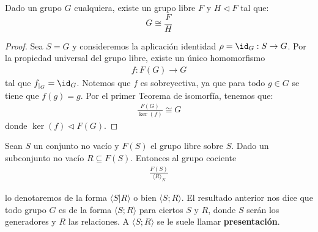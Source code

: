 \begin{coro}
    Dado un grupo $G$ cualquiera, existe un grupo libre $F$ y $H \lhd F$ tal que:
    \begin{equation*}
        G \cong \frac{F}{H}
    \end{equation*}
    \begin{proof}
        Sea $S=G$ y consideremos la aplicación identidad $\rho = \id_G : S \to G$. Por la propiedad universal del grupo libre, existe un único homomorfismo
        \begin{gather*}
            f:F(G) \to G
        \end{gather*}
        tal que $f_{|_G}=\id_G$. Notemos que $f$ es sobreyectiva, ya que para todo $g\in G$ se tiene que $f(g)=g$. Por el primer Teorema de isomorfía, tenemos que:
        \begin{gather*}
            \frac{F(G)}{\ker(f)} \cong G
        \end{gather*}
        donde $\ker(f)\lhd F(G)$.
    \end{proof}
\end{coro}

\begin{definicion}
    Sean $S$ un conjunto no vacío y $F(S)$ el grupo libre sobre $S$. Dado un subconjunto no vacío $R\subseteq F(S)$. Entonces al grupo cociente
    \begin{gather*}
        \frac{F(S)}{\langle R \rangle_N}
    \end{gather*}
        
    lo denotaremos de la forma $\langle S | R \rangle$ o bien $\langle S;R \rangle$. El resultado anterior nos dice que todo grupo $G$ es de la forma $\langle S;R\rangle$ para ciertos $S$ y $R$, donde $S$ serán los generadores y $R$ las relaciones. A $\langle S;R \rangle$ se le suele llamar \textbf{presentación}.
\end{definicion}

